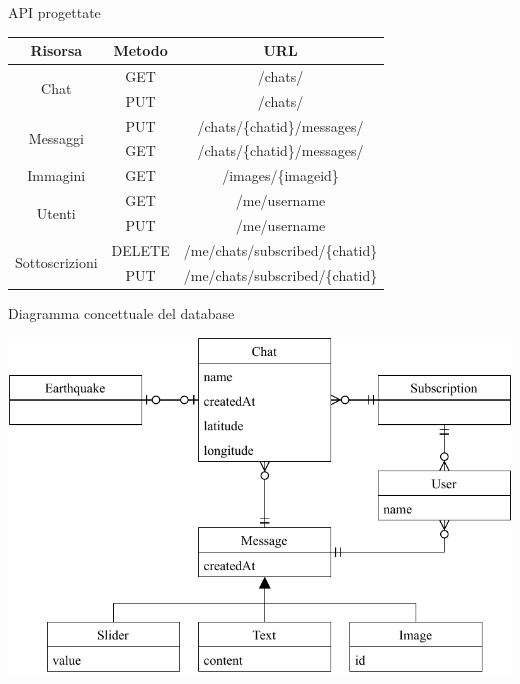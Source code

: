 \documentclass[compress]{beamer}
\begin{document}
\begin{frame}[c]{API progettate}
\begin{table}[ht!]
\centering
\begin{tabular}{c|c|c}
\textbf{Risorsa} & \textbf{Metodo} & \textbf{URL} \\
\hline
\multirow{2}{*}{Chat} & GET & /chats/ \\
    & PUT & /chats/ \\
\hline
\multirow{2}{*}{Messaggi} & PUT & /chats/\{chatid\}/messages/ \\
    & GET & /chats/\{chatid\}/messages/ \\
\hline
Immagini & GET & /images/\{imageid\} \\
\hline
\multirow{2}{*}{Utenti} & GET & /me/username \\
    & PUT & /me/username \\
\hline
\multirow{2}{*}{Sottoscrizioni} & DELETE & /me/chats/subscribed/\{chatid\} \\
    & PUT & /me/chats/subscribed/\{chatid\}
\end{tabular}
\end{table}
\end{frame}

\begin{frame}[c]{Diagramma concettuale del database}
\begin{center}
\includegraphics[scale=0.7]{assets/03/concettuale.pdf}
\end{center}
\end{frame}
\end{document}
